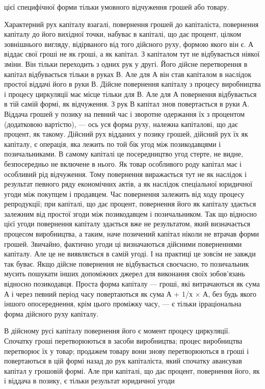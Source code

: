 \parcont{}  %
цієї специфічної форми тільки умовного відчуження грошей
або товару.

Характерний рух капіталу взагалі, повернення грошей до
капіталіста, повернення капіталу до його вихідної точки, набуває
в капіталі, що дає процент, цілком зовнішнього вигляду,
відірваного від того дійсного руху, формою якого він є. А віддає
свої гроші не як гроші, а як капітал. З капіталом тут не
відбувається ніякої зміни. Він тільки переходить з одних рук
у другі. Його дійсне перетворення в капітал відбувається тільки
в руках В. Але для А він став капіталом в наслідок простої
віддачі його в руки В. Дійсне повернення капіталу з процесу
виробництва і процесу циркуляції має місце тільки для В.
Але для А повернення відбувається в тій самій формі, як
відчуження. З рук В капітал знов повертається в руки А. Віддача
грошей у позику на певний час і зворотне одержання їх
з процентом (додатковою вартістю), — ось уся форма руху, належна
капіталові, що дає процент, як такому. Дійсний рух відданих
у позику грошей, дійсний рух їх як капіталу, є операція,
яка лежить по той бік угод між позикодавцями і позичальниками.
В самому капіталі це посередництво угод стерте, не видне, безпосередньо
не включене в нього. Як товар особливого роду
капітал має і особливий рід відчуження. Тому повернення виражається
тут не як наслідок і результат певного ряду економічних
актів, а як наслідок спеціальної юридичної угоди між
покупцем і продавцем. Час повернення залежить від ходу процесу
репродукції; при капіталі, що дає процент, повернення
його як капіталу здається залежним від простої згоди між позикодавцем
і позичальником. Так що відносно цієї угоди повернення
капіталу здається вже не результатом, який визначається процесом
виробництва, а таким, наче позичений капітал ніколи не
втрачав форми грошей. Звичайно, фактично угоди ці визначаються
дійсними поверненнями капіталу. Але це не виявляється
в самій угоді. І на практиці це зовсім не завжди так буває.
Якщо дійсне повернення не відбувається своєчасно, то позичальник
мусить пошукати інших допоміжних джерел для виконання
своїх зобов’язань відносно позикодавця. Проста форма капіталу
— гроші, які витрачаються як сума А і через певний період
часу повертаються як сума А + 1/х × А, без будь якого іншого опосереднення,
крім цього проміжку часу, — є тільки ірраціональна
форма дійсного руху капіталу.

В дійсному русі капіталу повернення його є момент процесу
циркуляції. Спочатку гроші перетворюються в засоби виробництва;
процес виробництва перетворює їх у товар; продажем товару
вони знову перетворюються в гроші і повертаються в цій формі
назад до рук капіталіста, який спочатку авансував капітал у грошовій
формі. Але при капіталі, що дає процент, повернення
його, як і віддача в позику, є тільки результат юридичної угоди
\parbreak{}  %
